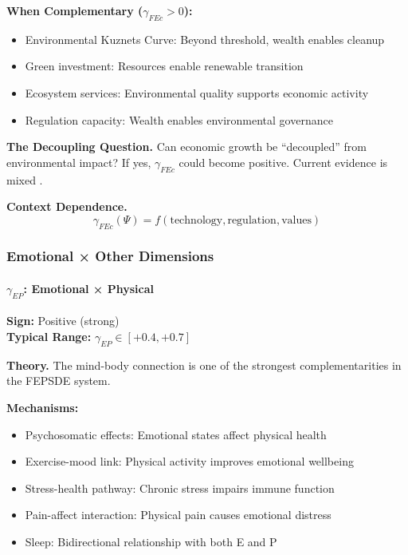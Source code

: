 \textbf{When Complementary ($\gamma_{FEc} > 0$):}
\begin{itemize}
    \item Environmental Kuznets Curve: Beyond threshold, wealth enables cleanup
    \item Green investment: Resources enable renewable transition
    \item Ecosystem services: Environmental quality supports economic activity
    \item Regulation capacity: Wealth enables environmental governance
\end{itemize}

\textbf{The Decoupling Question.}
Can economic growth be ``decoupled'' from environmental impact? If yes, 
$\gamma_{FEc}$ could become positive. Current evidence is mixed 
\citep{hickel2020decoupling}.

\textbf{Context Dependence.}
\begin{equation}
\gamma_{FEc}(\Psi) = f(\text{technology}, \text{regulation}, \text{values})
\end{equation}


\subsubsection{Emotional × Other Dimensions}

\paragraph{$\gamma_{EP}$: Emotional × Physical}

\begin{tcolorbox}[colback=green!5, colframe=green!50!black]
\textbf{Sign:} Positive (strong) \\
\textbf{Typical Range:} $\gamma_{EP} \in [+0.4, +0.7]$
\end{tcolorbox}

\textbf{Theory.}
The mind-body connection is one of the strongest complementarities in the 
FEPSDE system.

\textbf{Mechanisms:}
\begin{itemize}
    \item Psychosomatic effects: Emotional states affect physical health
    \item Exercise-mood link: Physical activity improves emotional wellbeing
    \item Stress-health pathway: Chronic stress impairs immune function
    \item Pain-affect interaction: Physical pain causes emotional distress
    \item Sleep: Bidirectional relationship with both E and P
\end{itemize}

